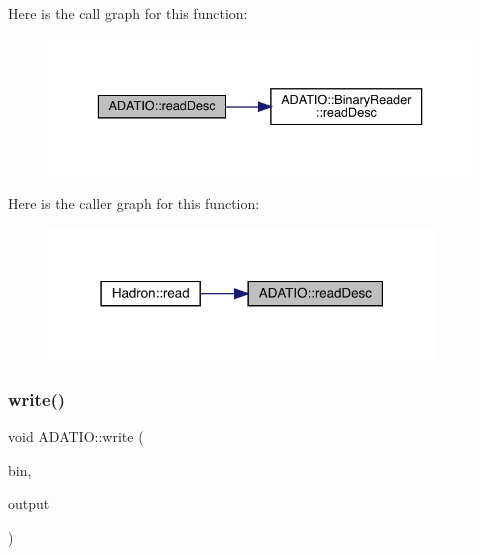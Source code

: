 Here is the call graph for this function\+:
\nopagebreak
\begin{figure}[H]
\begin{center}
\leavevmode
\includegraphics[width=336pt]{d0/dba/namespaceADATIO_af57306a140489d28cd8fa1107d585906_cgraph}
\end{center}
\end{figure}
Here is the caller graph for this function\+:
\nopagebreak
\begin{figure}[H]
\begin{center}
\leavevmode
\includegraphics[width=291pt]{d0/dba/namespaceADATIO_af57306a140489d28cd8fa1107d585906_icgraph}
\end{center}
\end{figure}
\mbox{\label{namespaceADATIO_a12d01adc4b592d85f0f5f5c101205c08}} 
\subsubsection{\texorpdfstring{write()}{write()}\hspace{0.1cm}{\footnotesize\ttfamily [1/25]}}
{\footnotesize\ttfamily void A\+D\+A\+T\+I\+O\+::write (\begin{DoxyParamCaption}\item[{\mbox{\hyperlink{classADATIO_1_1BinaryWriter}{Binary\+Writer}} \&}]{bin,  }\item[{const std\+::string \&}]{output }\end{DoxyParamCaption})}

